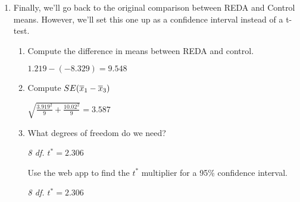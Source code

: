 \begin{enumerate}
\begin{enumerate}
     \end{enumerate}

     \begin{center}
       {\large\bf Confidence Interval}

 Reminder. The general form of a t-based CI is:
     \end{center}
  $$ \mbox{estimate} \pm t^*_{df} \times SE(\mbox{estimate}) $$ 

 \item Finally, we'll go back to the original comparison between REDA
   and Control means. However, we'll set this one up as a confidence
   interval instead of a t-test. 
   \begin{enumerate}
   \item Compute the difference in means between REDA and control.
\begin{students}
    \vspace{.5cm}    
\end{students}

\begin{key}
  {\it  $1.219-( -8.329) = 9.548 $}
\end{key}

   \item Compute  $SE(\overline{x}_1-\overline{x}_3)$
\begin{students}
    \vspace{.5cm}    
\end{students}

\begin{key}
  {\it $\sqrt{ \frac{3.919^2}{9} + \frac{10.02^2}{9}}= 3.587$}
\end{key}

   \item What degrees of freedom do we need?\\ 
\begin{students}
    \vspace{.5cm}    
\end{students}

\begin{key}
  {\it  8 df.   $t^* = 2.306 $}
\end{key}
     Use the web app to find the $t^*$ multiplier for a 95\% 
     confidence interval.
\begin{students}
    \vspace{.5cm}    
\end{students}

\begin{key}
  {\it  8 df.   $t^* = 2.306 $}
\end{key}


\end{enumerate}
\end{enumerate}
